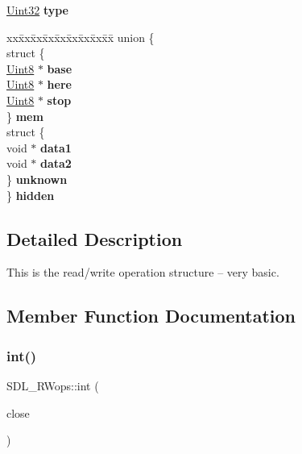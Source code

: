 \begin{DoxyCompactItemize}
\item 
\mbox{\label{struct_s_d_l___r_wops_a099017bfceaac24ced0e4d08a4e0a023}} 
\hyperlink{_s_d_l__stdinc_8h_add440eff171ea5f55cb00c4a9ab8672d}{Uint32} {\bfseries type}
\item 
\mbox{\label{struct_s_d_l___r_wops_a2bf0dec0395f771b30c841fc7296164b}} 
\begin{tabbing}
xx\=xx\=xx\=xx\=xx\=xx\=xx\=xx\=xx\=\kill
union \{\\
\>struct \{\\
\>\>\hyperlink{_s_d_l__stdinc_8h_a2944638813a090aa23e62f4da842c3e2}{Uint8} $\ast$ {\bfseries base}\\
\>\>\hyperlink{_s_d_l__stdinc_8h_a2944638813a090aa23e62f4da842c3e2}{Uint8} $\ast$ {\bfseries here}\\
\>\>\hyperlink{_s_d_l__stdinc_8h_a2944638813a090aa23e62f4da842c3e2}{Uint8} $\ast$ {\bfseries stop}\\
\>\} {\bfseries mem}\\
\>struct \{\\
\>\>void $\ast$ {\bfseries data1}\\
\>\>void $\ast$ {\bfseries data2}\\
\>\} {\bfseries unknown}\\
\} {\bfseries hidden}\\

\end{tabbing}\end{DoxyCompactItemize}


\subsection{Detailed Description}
This is the read/write operation structure -- very basic. 

\subsection{Member Function Documentation}
\mbox{\label{struct_s_d_l___r_wops_ab303bcbb0f6742a141ba8b2998923f47}} 
\subsubsection{\texorpdfstring{int()}{int()}}
{\footnotesize\ttfamily S\+D\+L\+\_\+\+R\+Wops\+::int (\begin{DoxyParamCaption}\item[{S\+D\+L\+C\+A\+LL $\ast$}]{close }\end{DoxyParamCaption})}

